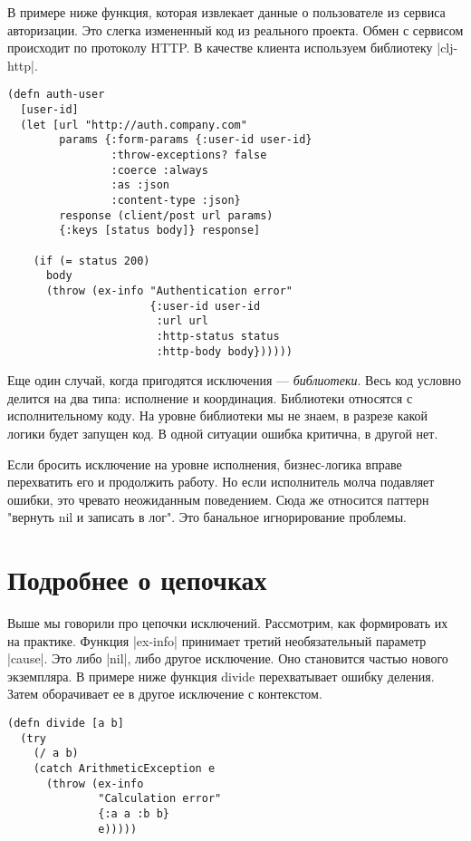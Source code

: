 В примере ниже функция, которая извлекает данные о пользователе из сервиса
авторизации. Это слегка измененный код из реального проекта. Обмен с сервисом
происходит по протоколу HTTP. В качестве клиента используем библиотеку
\spverb|clj-http|.

\begin{verbatim}
(defn auth-user
  [user-id]
  (let [url "http://auth.company.com"
        params {:form-params {:user-id user-id}
                :throw-exceptions? false
                :coerce :always
                :as :json
                :content-type :json}
        response (client/post url params)
        {:keys [status body]} response]

    (if (= status 200)
      body
      (throw (ex-info "Authentication error"
                      {:user-id user-id
                       :url url
                       :http-status status
                       :http-body body})))))
\end{verbatim}

Еще один случай, когда пригодятся исключения — \emph{библиотеки}. Весь код условно
делится на два типа: исполнение и координация. Библиотеки относятся с
исполнительному коду. На уровне библиотеки мы не знаем, в разрезе какой логики
будет запущен код. В одной ситуации ошибка критична, в другой нет.

Если бросить исключение на уровне исполнения, бизнес-логика вправе перехватить
его и продолжить работу. Но если исполнитель молча подавляет ошибки, это чревато
неожиданным поведением. Сюда же относится паттерн "вернуть nil и записать в
лог". Это банальное игнорирование проблемы.

\section{Подробнее о цепочках}

Выше мы говорили про цепочки исключений. Рассмотрим, как формировать их на
практике. Функция \spverb|ex-info| принимает третий необязательный параметр
\spverb|cause|. Это либо \spverb|nil|, либо другое исключение. Оно становится частью нового
экземпляра. В примере ниже функция divide перехватывает ошибку деления. Затем
оборачивает ее в другое исключение с контекстом.

\begin{verbatim}
(defn divide [a b]
  (try
    (/ a b)
    (catch ArithmeticException e
      (throw (ex-info
              "Calculation error"
              {:a a :b b}
              e)))))
\end{verbatim}

